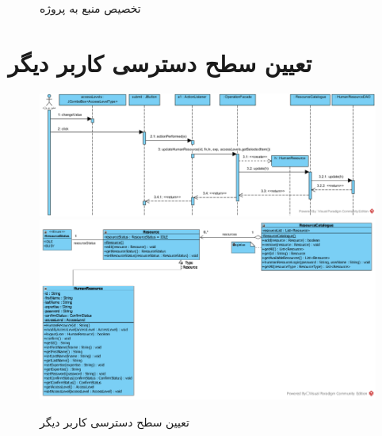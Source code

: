 \begin{landscape}
\begin{figure}[H]
	\caption{تخصیص منبع به پروژه}
\end{figure}
\end{landscape}

\section{تعیین سطح دسترسی کاربر دیگر}
\begin{figure}[H]
	\centering
	\includegraphics[scale=0.55]{img/sequence-design/SetUserAccessLevel}
	\includegraphics[scale=0.6]{img/sequence-design/SetUserAccessLevelC}
	\caption{تعیین سطح دسترسی کاربر دیگر}
\end{figure}


